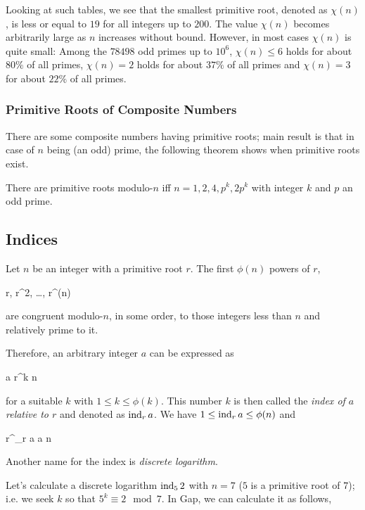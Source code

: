 Looking at such tables, we see that the smallest primitive root, denoted as $\chi(n)$, is less or equal to $19$ for all integers up to $200$. The value $\chi(n)$ becomes arbitrarily large as $n$ increases without bound. However, in most cases $\chi(n)$ is quite small: Among the $78498$ odd primes up to $10^6$, $\chi(n) \leq 6$ holds for about $80\%$ of all primes, $\chi(n) = 2$ holds for about $37\%$ of all primes and $\chi(n) = 3$ for about $22\%$ of all primes.

\subsubsection{Primitive Roots of Composite Numbers}

There are some composite numbers having primitive roots; main result is that in case of $n$ being (an odd) prime, the following theorem shows when primitive roots exist.

\begin{theorem}
  There are primitive roots modulo-$n$ iff $n=1,2,4, p^k, 2p^k$ with integer $k$ and $p$ an odd prime.
\end{theorem}



\subsection{Indices}

Let $n$ be an integer with a primitive root $r$. The first $\phi(n)$ powers of $r$,

\bee
r, r^2, \ldots, r^{\phi(n)}
\eee

are congruent modulo-$n$, in some order, to those integers less than $n$ and relatively prime to it. 


Therefore, an arbitrary integer $a$ can be expressed as

\bee
a \equiv r^k \mod n
\eee

for a suitable $k$ with $1 \leq k \leq \phi(k)$. This number $k$ is then called the \emph{index of $a$ relative to $r$} and denoted as $\operatorname{ind}_r a$. We have $1 \leq \operatorname{ind}_r a \leq \phi(n)$ and

\bee
r^{\ind_r a} \equiv a \mod n
\eee

Another name for the index is \emph{discrete logarithm}.

Let's calculate a discrete logarithm $\operatorname{ind}_5 2$ with $n=7$ ($5$ is a primitive root of $7$); i.e. we seek $k$ so that $5^k \equiv 2 \mod 7$. In Gap, we can calculate it as follows,

